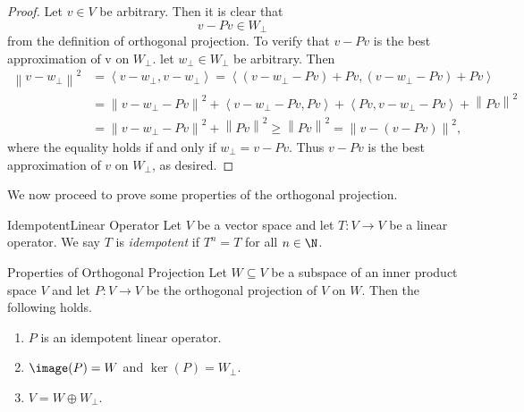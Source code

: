 \documentclass[linearalgebra]{subfiles}
\begin{document}
    \begin{proof}
        Let $v\in V$ be arbitrary. Then it is clear that
        \begin{equation*}
            v - Pv \in W_\perp 
        \end{equation*}
        from the definition of orthogonal projection. To verify that $v-Pv$ is the best approximation of v on $W_\perp$. let $w_\perp\in W_\perp$ be arbitrary. Then
        \begin{align*}
            \left\lVert v-w_\perp\right\rVert ^2 & = \left\langle v-w_\perp, v-w_\perp\right\rangle = \left\langle \left( v-w_\perp-Pv \right) + Pv, \left( v-w_\perp-Pv \right) + Pv\right\rangle \\
                                                 & = \left\lVert v-w_\perp-Pv\right\rVert ^2 + \left\langle v-w_\perp-Pv, Pv\right\rangle + \left\langle Pv, v-w_\perp-Pv\right\rangle + \left\lVert Pv\right\rVert ^2 \\
                                                 & = \left\lVert v-w_\perp-Pv\right\rVert ^2 + \left\lVert Pv\right\rVert ^2 \geq \left\lVert Pv\right\rVert ^2 = \left\lVert v-\left( v-Pv \right) \right\rVert ^2,
        \end{align*} 
        where the equality holds if and only if $w_\perp = v - Pv$. Thus $v-Pv$ is the best approximation of $v$ on $W_\perp$, as desired.
    \end{proof}

    \begin{remark}
        We now proceed to prove some properties of the orthogonal projection.
    \end{remark}

    \begin{definition}{Idempotent}{Linear Operator}
        Let $V$ be a vector space and let $T:V\to V$ be a linear operator. We say $T$ is \emph{idempotent} if $T^n=T$ for all $n\in\N$.
    \end{definition}

    \begin{prop}{Properties of Orthogonal Projection}
        Let $W\subseteq V$ be a subspace of an inner product space $V$ and let $P:V\to V$ be the orthogonal projection of $V$ on $W$. Then the following holds.
        \begin{enumerate}
            \item $P$ is an idempotent linear operator.
            \item $\image(P) = W$ and $\ker(P) = W_\perp$.
            \item $V = W\oplus W_\perp$.
        \end{enumerate}
    \end{prop}
\end{document}
